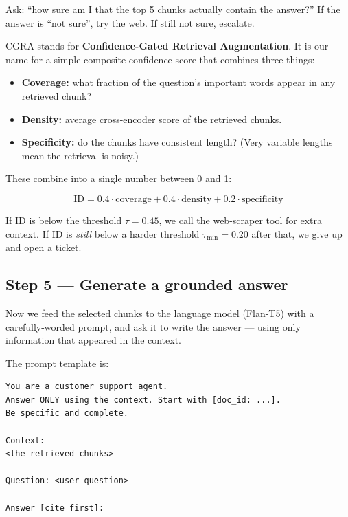 \documentclass[11pt,a4paper]{article}
\begin{document}
\begin{keyidea}
Ask: ``how sure am I that the top 5 chunks actually contain the answer?'' If the answer is ``not sure'', try the web. If still not sure, escalate.
\end{keyidea}

CGRA stands for \textbf{Confidence-Gated Retrieval Augmentation}. It is our name for a simple composite confidence score that combines three things:

\begin{itemize}[leftmargin=*, itemsep=1pt]
\item \textbf{Coverage:} what fraction of the question's important words appear in any retrieved chunk?
\item \textbf{Density:} average cross-encoder score of the retrieved chunks.
\item \textbf{Specificity:} do the chunks have consistent length? (Very variable lengths mean the retrieval is noisy.)
\end{itemize}

These combine into a single number between 0 and 1:

\[ \text{ID} = 0.4 \cdot \text{coverage} + 0.4 \cdot \text{density} + 0.2 \cdot \text{specificity} \]

If ID is below the threshold $\tau=0.45$, we call the web-scraper tool for extra context. If ID is \emph{still} below a harder threshold $\tau_{\min}=0.20$ after that, we give up and open a ticket.

\subsection{Step 5 --- Generate a grounded answer}

\begin{keyidea}
Now we feed the selected chunks to the language model (Flan-T5) with a carefully-worded prompt, and ask it to write the answer --- using only information that appeared in the context.
\end{keyidea}

The prompt template is:

\begin{lstlisting}[basicstyle=\ttfamily\footnotesize]
You are a customer support agent.
Answer ONLY using the context. Start with [doc_id: ...].
Be specific and complete.

Context:
<the retrieved chunks>

Question: <user question>

Answer [cite first]:
\end{lstlisting}
\end{document}
